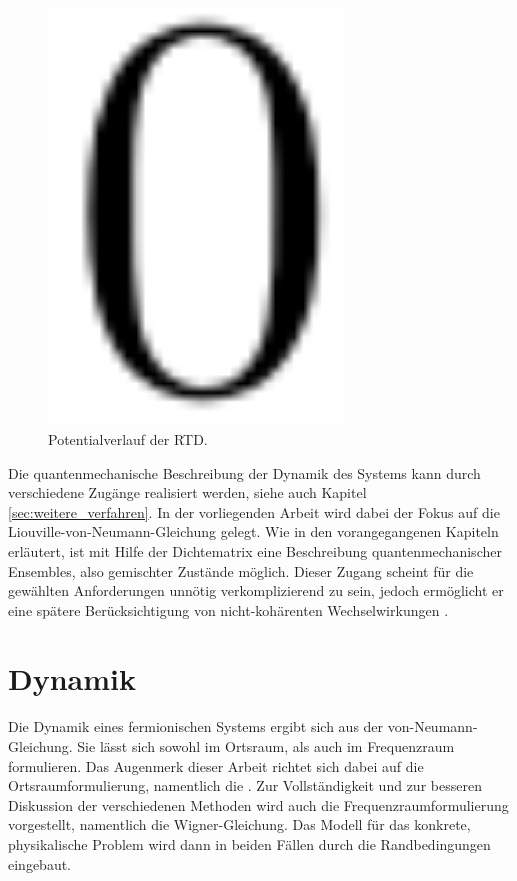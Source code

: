 \begin{figure}
  \centering
  \includegraphics[width=0.7\textwidth]{files/potential.pdf}
  \caption{Potentialverlauf der RTD.}
  \label{fig:pot1}
\end{figure}

Die quantenmechanische Beschreibung der Dynamik des Systems kann durch verschiedene Zugänge realisiert werden, siehe auch Kapitel \ref{sec:weitere_verfahren}. In der vorliegenden Arbeit wird dabei der Fokus auf die Liouville-von-Neumann-Gleichung gelegt. Wie in den vorangegangenen Kapiteln erläutert, ist mit Hilfe der Dichtematrix eine Beschreibung quantenmechanischer Ensembles, also gemischter Zustände möglich. Dieser Zugang scheint für die gewählten Anforderungen unnötig verkomplizierend zu sein, jedoch ermöglicht er eine spätere Berücksichtigung von nicht-kohärenten Wechselwirkungen \cite{wiedenhaus}.


\section{Dynamik}
Die Dynamik eines fermionischen Systems ergibt sich aus der von-Neumann-Gleichung. Sie lässt sich sowohl im Ortsraum, als auch im Frequenzraum formulieren. Das Augenmerk dieser Arbeit richtet sich dabei auf die Ortsraumformulierung, namentlich die \lvn. Zur Vollständigkeit und zur besseren Diskussion der verschiedenen Methoden wird auch die Frequenzraumformulierung vorgestellt, namentlich die Wigner-Gleichung. Das Modell für das konkrete, physikalische Problem wird dann in beiden Fällen durch die Randbedingungen eingebaut.

